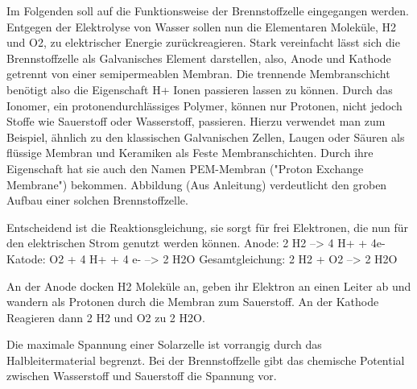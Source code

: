 Im Folgenden soll auf die Funktionsweise der Brennstoffzelle eingegangen werden. 
Entgegen der Elektrolyse von Wasser sollen nun die Elementaren Moleküle, H2 und O2, zu elektrischer Energie zurückreagieren.
Stark vereinfacht lässt sich die Brennstoffzelle als Galvanisches Element darstellen, also, Anode und Kathode getrennt von einer semipermeablen Membran.
Die trennende Membranschicht benötigt also die Eigenschaft H+ Ionen passieren lassen zu können.
Durch das Ionomer, ein protonendurchlässiges Polymer, können nur Protonen, nicht jedoch Stoffe wie Sauerstoff oder Wasserstoff, passieren.
Hierzu verwendet man zum Beispiel, ähnlich zu den klassischen Galvanischen Zellen, Laugen oder Säuren als flüssige Membran und Keramiken als Feste Membranschichten.
Durch ihre Eigenschaft hat sie auch den Namen PEM-Membran ("Proton Exchange Membrane") bekommen.
Abbildung (Aus Anleitung) verdeutlicht den groben Aufbau einer solchen Brennstoffzelle.

Entscheidend ist die Reaktionsgleichung, sie sorgt für frei Elektronen, die nun für den elektrischen Strom genutzt werden können.
Anode:
2 H2  --> 4 H+ + 4e-
Katode:
O2 + 4 H+ + 4 e-  --> 2 H2O
Gesamtgleichung:
2 H2 + O2 --> 2 H2O

An der Anode docken H2 Moleküle an, geben ihr Elektron an einen Leiter ab und wandern als Protonen durch die Membran zum Sauerstoff.
An der Kathode Reagieren dann 2 H2 und O2 zu 2 H2O.


Die maximale Spannung einer Solarzelle ist vorrangig durch das Halbleitermaterial begrenzt. Bei der Brennstoffzelle gibt das chemische Potential zwischen Wasserstoff und Sauerstoff die Spannung vor.
